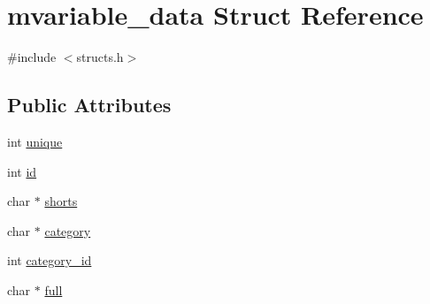 \hypertarget{structmvariable__data}{\section{mvariable\-\_\-data Struct Reference}
\label{structmvariable__data}
}


{\ttfamily \#include $<$structs.\-h$>$}

\subsection*{Public Attributes}
\begin{DoxyCompactItemize}
\item 
int \hyperlink{structmvariable__data_a1cd531a14e5edfc9c8e774e2b5029c0f}{unique}
\item 
int \hyperlink{structmvariable__data_ae547d95e0661c808ce69879439316889}{id}
\item 
char $\ast$ \hyperlink{structmvariable__data_a3bc64a49fa59032dd40216c8ece63c12}{shorts}
\item 
char $\ast$ \hyperlink{structmvariable__data_a005d2774ed9a33d1f2be5b628a0a612c}{category}
\item 
int \hyperlink{structmvariable__data_ab447ff2cc2c667f5c406ac4b2404986c}{category\-\_\-id}
\item 
char $\ast$ \hyperlink{structmvariable__data_ae4dd988bed14131ebe7e5b3724e0a535}{full}
\end{DoxyCompactItemize}


